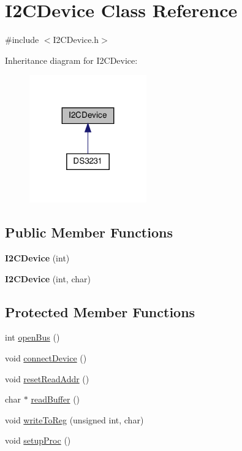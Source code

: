 \hypertarget{classI2CDevice}{}\section{I2\+C\+Device Class Reference}
\label{classI2CDevice}


{\ttfamily \#include $<$I2\+C\+Device.\+h$>$}



Inheritance diagram for I2\+C\+Device\+:
\nopagebreak
\begin{figure}[H]
\begin{center}
\leavevmode
\includegraphics[width=143pt]{classI2CDevice__inherit__graph}
\end{center}
\end{figure}
\subsection*{Public Member Functions}
\begin{DoxyCompactItemize}
\item 
\mbox{\label{classI2CDevice_a813e9eaaed2de0a6089e061e925f25a7}} 
{\bfseries I2\+C\+Device} (int)
\item 
\mbox{\label{classI2CDevice_a5967d5f4321fdb12006f1d3892f050f8}} 
{\bfseries I2\+C\+Device} (int, char)
\end{DoxyCompactItemize}
\subsection*{Protected Member Functions}
\begin{DoxyCompactItemize}
\item 
int \hyperlink{classI2CDevice_a5fde7fd1a0060a67fc79508cadf6aace}{open\+Bus} ()
\item 
void \hyperlink{classI2CDevice_a97ce3e695080f667e4acfa4c6fe82ba4}{connect\+Device} ()
\item 
void \hyperlink{classI2CDevice_a683bdc938beaea0fc8af85f3996c4aa6}{reset\+Read\+Addr} ()
\item 
char $\ast$ \hyperlink{classI2CDevice_a46507a420f6865581ad41d6198897ee7}{read\+Buffer} ()
\item 
void \hyperlink{classI2CDevice_a390fcd7a411fbc92509a69c1d04660a2}{write\+To\+Reg} (unsigned int, char)
\item 
void \hyperlink{classI2CDevice_aa3a0bbea776167210f22dc03580757b1}{setup\+Proc} ()
\end{DoxyCompactItemize}
